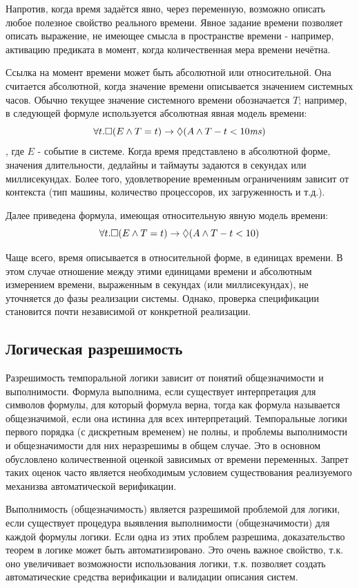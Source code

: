 		 Напротив, когда время задаётся явно, через переменную, возможно описать любое полезное свойство реального времени.
		 Явное задание времени позволяет описать выражение, не имеющее смысла в пространстве времени - например, активацию предиката в момент, когда количественная мера времени нечётна.
		 
		 Ссылка на момент времени может быть абсолютной или относительной.
		 Она считается абсолютной, когда значение времени описывается значением системных часов.
		 Обычно текущее значение системного времени обозначается $ T $; например, в следующей формуле используется абсолютная явная модель времени: \[\forall t.\square(E \land T = t) \rightarrow \lozenge (A \land T - t < 10 \text{\emph{ms}}) \], где $ E $ - событие в системе.
		 Когда время представлено в абсолютной форме, значения длительности, дедлайны и таймауты задаются в секундах или миллисекундах.
		 Более того, удовлетворение временным ограничениям зависит от контекста (тип машины, количество процессоров, их загруженность и т.д.).
		 
		 Далее приведена формула, имеющая относительную явную модель времени:\[ \forall t. \square(E \land T = t) \rightarrow \lozenge (A \land T - t < 10)\]
		 
		 Чаще всего, время описывается в относительной форме, в единицах времени.
		 В этом случае отношение между этими единицами времени и абсолютным измерением времени, выраженным в секундах (или миллисекундах), не уточняется до фазы реализации системы.
		 Однако, проверка спецификации становится почти независимой от конкретной реализации.
		 
		 \subsection{Логическая разрешимость}
		  Разрешимость темпоральной логики зависит от понятий общезначимости и выполнимости. 
		  Формула выполнима, если существует интерпретация для символов формулы, для который формула верна, тогда как формула называется общезначимой, если она истинна для всех интерпретаций.
		  Темпоральные логики первого порядка (с дискретным временем) не полны, и проблемы выполнимости и общезначимости для них неразрешимы в общем случае.
		  Это в основном обусловлено количественной оценкой зависимых от времени переменных.
		  Запрет таких оценок часто является необходимым условием существования реализуемого механизва автоматической верификации.
		  
		  Выполнимость (общезначимость) является разрешимой проблемой для логики, если существует процедура выявления выполнимости (общезначимости) для каждой формулы логики.
		  Если одна из этих проблем разрешима, доказательство теорем в логике может быть автоматизировано.
		  Это очень важное свойство, т.к. оно увеличивает возможности использования логики, т.к. позволяет создать автоматические средства верификации и валидации описания систем.
		  
